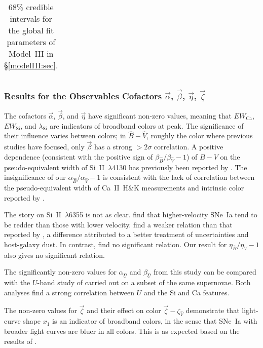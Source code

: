\documentclass[trackchanges]{aastex62}   	%
\begin{document}
\begin{table}
\begin{tabular}{|c|c|c|c|c|c|}
\hline
\end{tabular}
\caption{68\% credible intervals for the global fit parameters of Model~III in \S\ref{modelIII:sec}.\label{global3:tab}}
\end{table}



\subsubsection{Results for the Observables Cofactors $\vec{\alpha}$, $\vec{\beta}$, $\vec{\eta}$,  $\vec{\zeta}$}

The cofactors  $\vec{\alpha}$, $\vec{\beta}$, and $\vec{\eta}$ have  significant non-zero values,  meaning that
$EW_{\mathrm{Ca}}$, $EW_{\mathrm{Si}}$, and $\lambda_{\mathrm{Si}}$ are indicators of broadband
colors at peak.  The significance of their influence varies between  colors; in $\hat{B}-\hat{V}$, roughly the color
where previous studies have focused, only $\vec{\beta}$ has a strong $>2\sigma$ correlation.  A positive
dependence (consistent with the positive sign
of $\beta_{\hat{B}}/\beta_{\hat{V}}-1$)
of $B-V$ on the pseudo-equivalent width of Si~II~$\lambda$4130 has previously been reported by
\citet{2011ApJ...734...42N, 2013ApJ...773...53F}.
The insignificance of  our $\alpha_{\hat{B}}/\alpha_{\hat{V}}-1$ is consistent with the
lack of correlation between the  pseudo-equivalent width of Ca~II~H\&K measurements and
intrinsic color reported by \citet{2011ApJ...742...89F}.

The story on Si~II~$\lambda$6355 is not as clear.
 \citet{2009ApJ...699L.139W,2011ApJ...742...89F, 2012ApJ...748..127F} find that
higher-velocity SNe~Ia tend to be redder than those with lower velocity. \citet{2012AJ....143..126B} find a
weaker relation than that reported by \citet{2011ApJ...742...89F},
a difference attributed to a better treatment of uncertainties and host-galaxy dust. In contrast,
\citet{2013ApJ...773...53F} find no significant relation.
Our result for $\eta_{\hat{B}}/\eta_{\hat{V}}-1$ also gives no significant relation. 

The significantly non-zero values for  $\alpha_{\hat{U}}$ and $\beta_{\hat{U}}$ from this study can be compared with the $U$-band study of
\citet{2018arXiv180101834N} carried out on a subset of the same supernovae.
Both analyses find a strong correlation between $U$ and the Si and Ca features.

The non-zero values for $\vec{\zeta}$ and their effect on color $\vec{\zeta}-\zeta_{\hat{V}}$  demonstrate that light-curve shape $x_1$ is  an indicator
of broadband colors, in the sense that SNe~Ia with broader light curves are bluer in all colors.
This is as expected based on the results of \citet{2007A&A...466...11G, 2007ApJ...659..122J}.
\end{document}
